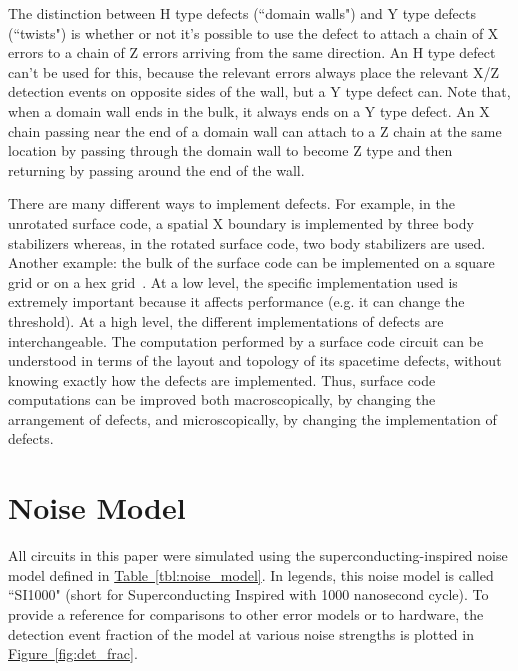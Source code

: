 \documentclass[onecolumn,unpublished,a4paper]{quantumarticle}
\theoremstyle{definition}
\theoremstyle{definition}
\theoremstyle{definition}
\newcommand{\fig}[1]{\hyperref[fig:#1]{Figure~\ref*{fig:#1}}}
\newcommand{\tbl}[1]{\hyperref[tbl:#1]{Table~\ref*{tbl:#1}}}
\begin{document}
The distinction between H type defects (``domain walls") and Y type defects (``twists") is whether or not it's possible to use the defect to attach a chain of X errors to a chain of Z errors arriving from the same direction.
An H type defect can't be used for this, because the relevant errors always place the relevant X/Z detection events on opposite sides of the wall, but a Y type defect can.
Note that, when a domain wall ends in the bulk, it always ends on a Y type defect.
An X chain passing near the end of a domain wall can attach to a Z chain at the same location by passing through the domain wall to become Z type and then returning by passing around the end of the wall.

There are many different ways to implement defects.
For example, in the unrotated surface code, a spatial X boundary is implemented by three body stabilizers whereas, in the rotated surface code, two body stabilizers are used.
Another example: the bulk of the surface code can be implemented on a square grid or on a hex grid~\cite{mcewenmidoutsurfaces2023}.
At a low level, the specific implementation used is extremely important because it affects performance (e.g. it can change the threshold).
At a high level, the different implementations of defects are interchangeable.
The computation performed by a surface code circuit can be understood in terms of the layout and topology of its spacetime defects, without knowing exactly how the defects are implemented.
Thus, surface code computations can be improved both macroscopically, by changing the arrangement of defects, and microscopically, by changing the implementation of defects.

\section{Noise Model}
\label{app:noise_model}

All circuits in this paper were simulated using the superconducting-inspired noise model defined in \tbl{noise_model}.
In legends, this noise model is called ``SI1000" (short for Superconducting Inspired with 1000 nanosecond cycle).
To provide a reference for comparisons to other error models or to hardware, the detection event fraction of the model at various noise strengths is plotted in \fig{det_frac}.
\end{document}
